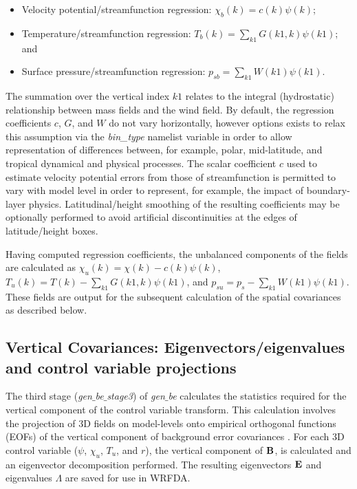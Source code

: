 \begin{itemize}\setlength{\parskip}{-4pt}
\item   Velocity potential/streamfunction regression: $\chi_b(k)=c(k)\psi(k)$;
\item	Temperature/streamfunction regression: $T_b(k)=\sum_{k1}G(k1,k)\psi(k1)$; and
\item	Surface pressure/streamfunction regression: $p_{sb}=\sum_{k1}W(k1)\psi(k1)$.
\end{itemize}

The summation over the vertical index $k1$ relates to the integral (hydrostatic) relationship between
mass fields and the wind field. By default, the regression coefficients $c$, $G$, and $W$ do 
not vary horizontally, however options exists to relax this assumption via the {\it bin\_type} 
namelist variable in order to allow representation of differences between, for example, polar, mid-latitude, 
and tropical dynamical and physical processes. The scalar coefficient $c$ used to 
estimate velocity potential errors from those of streamfunction is permitted to vary with model
level in order to represent, for example, the impact of boundary-layer physics. Latitudinal/height 
smoothing of the resulting coefficients may be optionally performed to avoid artificial 
discontinuities at the edges of latitude/height boxes.

Having computed regression coefficients, the unbalanced components of the fields are 
calculated as $\chi_{u}(k)=\chi(k)-c(k)\psi(k)$, $T_{u}(k)=T(k)-\sum_{k1}G(k1,k)\psi(k1)$, 
and $p_{su}=p_s - \sum_{k1} W(k1)\psi(k1)$. These fields are output for the 
subsequent calculation of the spatial covariances as described below.

\subsection{Vertical Covariances: Eigenvectors/eigenvalues and 
control variable projections} 

The third stage ({\it gen$\_$be$\_$stage3}) of {\it gen$\_$be}
calculates the statistics required for the vertical component of the
control variable transform. This calculation involves the projection
of 3D fields on model-levels onto empirical orthogonal functions
(EOFs) of the vertical component of background error covariances
\citet{barker04}. For each 3D control variable ($\psi$, $\chi_u$,
$T_u$, and $r$), the vertical component of ${\bf B}$, is calculated
and an eigenvector decomposition performed. The resulting eigenvectors
${\bf E}$ and eigenvalues $\Lambda$ are saved for use in WRFDA.

